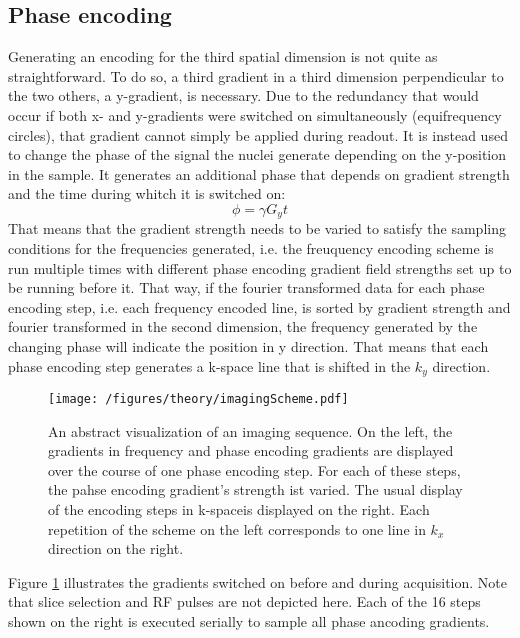        \subsection{Phase encoding}
            Generating an encoding for the third spatial dimension is not quite as straightforward.  To do so, a third gradient in a third dimension perpendicular to the two others, a y-gradient, is necessary.  Due to the redundancy that would occur if both x- and y-gradients were switched on simultaneously (equifrequency circles), that gradient cannot simply be applied during readout. It is instead used to change the phase of the signal the nuclei generate depending on the y-position in the sample. It generates an additional phase that depends on gradient strength and the time during whitch it is switched on:
            \begin{equation}
                \phi = \gamma G_y t
            \end{equation}
            That means that the gradient strength needs to be varied to satisfy the sampling conditions for the frequencies generated, i.e. the freuquency encoding scheme is run multiple times with different phase encoding gradient field strengths set up to be running before it. That way, if the fourier transformed data for each phase encoding step, i.e. each frequency encoded line, is sorted by gradient strength and fourier transformed in the second dimension, the frequency generated by the changing phase will indicate the position in y direction. That means that each phase encoding step generates a k-space line that is shifted in the $k_y$ direction.
            \begin{figure}
                \texttt{[image: /figures/theory/imagingScheme.pdf]}
                \centering
                \caption[k-space Graph]{An abstract visualization of an imaging sequence. On the left, the gradients in frequency and phase encoding gradients are displayed over the course of one phase encoding step. For each of these steps, the pahse encoding gradient's strength ist varied. The usual display of the encoding steps in k-spaceis displayed on the right. Each repetition of the scheme on the left corresponds to one line in $k_x$ direction on the right.}
                \label{figure:theory:MRIScheme}
            \end{figure}
            Figure \ref{figure:theory:MRIScheme} illustrates the gradients switched on before and during acquisition. Note that slice selection and RF pulses are not depicted here. Each of the 16 steps shown on the right is executed serially to sample all phase ancoding gradients.
